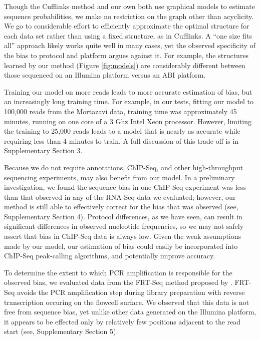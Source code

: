 \documentclass{bioinfo}
\begin{document}
Though the Cufflinks method and our own both use graphical models to estimate
sequence probabilities, we make no restriction on the graph other than
acyclicity. We go to considerable effort to efficiently approximate the optimal
structure for each data set rather than using a fixed structure, as in
Cufflinks. A ``one size fits all'' approach likely works quite well in many
cases, yet the observed specificity of the bias to protocol and platform argues
against it. For example, the structures learned by our method (Figure
\ref{fig:models}) are considerably different between those sequenced on an
Illumina platform versus an ABI platform.

Training our model on more reads leads to more accurate estimation of bias, but
an increasingly long training time. For example, in our tests, fitting our model to
100,000 reads from the Mortazavi data, training time was approximately 45
minutes, running on one core of a 3 Ghz Intel Xeon processor. However, limiting
the training to 25,000 reads leads to a model that is nearly as accurate while
requiring less than 4 minutes to train. A full discussion of this trade-off is in
Supplementary Section 3.

Because we do not require annotations, ChIP-Seq, and other high-throughput
sequencing experiments, may also benefit from our model. In a preliminary
investigation, we found the sequence bias in one ChIP-Seq experiment
\cite{Cao2010} was less than that observed in any of the RNA-Seq data we
evaluated; however, our method is still able to effectively correct for the bias
that was observed (see, Supplementary Section 4).  Protocol differences, as we
have seen, can result in significant differences in observed nucleotide
frequencies, so we may not safely assert that bias in ChIP-Seq data is always
low.  Given the weak assumptions made by our model, our estimation of bias could
easily be incorporated into ChIP-Seq peak-calling algorithms, and potentially
improve accuracy.

To determine the extent to which PCR amplification is responsible for the
observed bias, we evaluated data from the FRT-Seq method proposed by
\citet{Mamanova2010}.  FRT-Seq avoids the PCR amplification step during library
preparation with reverse transcription occuring on the flowcell surface. We
observed that this data is not free from sequence bias, yet unlike other data
generated on the Illumina platform, it appears to be effected only by relatively
few positions adjacent to the read start (see, Supplementary Section 5).
\end{document}
